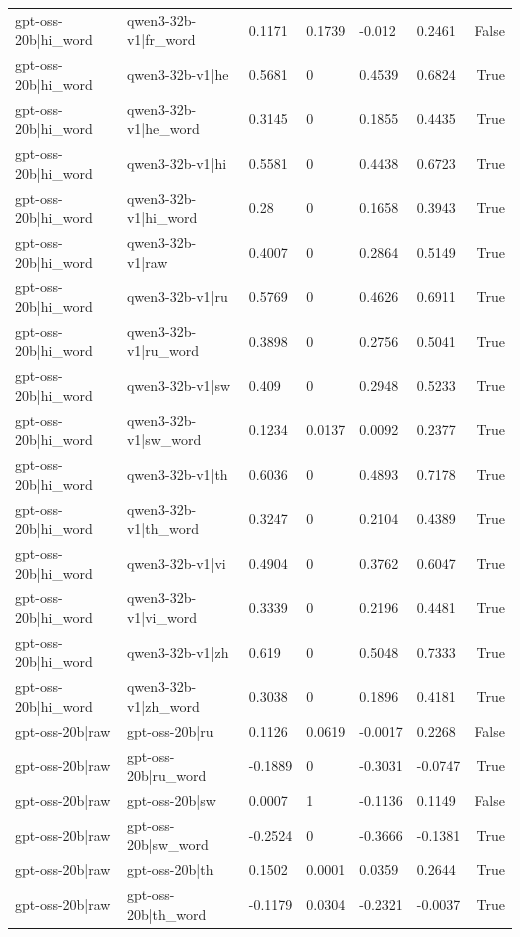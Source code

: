 \begin{table}
\begin{tabular}{llllllr}
gpt-oss-20b|hi_word & qwen3-32b-v1|fr_word & 0.1171 & 0.1739 & -0.012 & 0.2461 & False \\
gpt-oss-20b|hi_word & qwen3-32b-v1|he & 0.5681 & 0 & 0.4539 & 0.6824 & True \\
gpt-oss-20b|hi_word & qwen3-32b-v1|he_word & 0.3145 & 0 & 0.1855 & 0.4435 & True \\
gpt-oss-20b|hi_word & qwen3-32b-v1|hi & 0.5581 & 0 & 0.4438 & 0.6723 & True \\
gpt-oss-20b|hi_word & qwen3-32b-v1|hi_word & 0.28 & 0 & 0.1658 & 0.3943 & True \\
gpt-oss-20b|hi_word & qwen3-32b-v1|raw & 0.4007 & 0 & 0.2864 & 0.5149 & True \\
gpt-oss-20b|hi_word & qwen3-32b-v1|ru & 0.5769 & 0 & 0.4626 & 0.6911 & True \\
gpt-oss-20b|hi_word & qwen3-32b-v1|ru_word & 0.3898 & 0 & 0.2756 & 0.5041 & True \\
gpt-oss-20b|hi_word & qwen3-32b-v1|sw & 0.409 & 0 & 0.2948 & 0.5233 & True \\
gpt-oss-20b|hi_word & qwen3-32b-v1|sw_word & 0.1234 & 0.0137 & 0.0092 & 0.2377 & True \\
gpt-oss-20b|hi_word & qwen3-32b-v1|th & 0.6036 & 0 & 0.4893 & 0.7178 & True \\
gpt-oss-20b|hi_word & qwen3-32b-v1|th_word & 0.3247 & 0 & 0.2104 & 0.4389 & True \\
gpt-oss-20b|hi_word & qwen3-32b-v1|vi & 0.4904 & 0 & 0.3762 & 0.6047 & True \\
gpt-oss-20b|hi_word & qwen3-32b-v1|vi_word & 0.3339 & 0 & 0.2196 & 0.4481 & True \\
gpt-oss-20b|hi_word & qwen3-32b-v1|zh & 0.619 & 0 & 0.5048 & 0.7333 & True \\
gpt-oss-20b|hi_word & qwen3-32b-v1|zh_word & 0.3038 & 0 & 0.1896 & 0.4181 & True \\
gpt-oss-20b|raw & gpt-oss-20b|ru & 0.1126 & 0.0619 & -0.0017 & 0.2268 & False \\
gpt-oss-20b|raw & gpt-oss-20b|ru_word & -0.1889 & 0 & -0.3031 & -0.0747 & True \\
gpt-oss-20b|raw & gpt-oss-20b|sw & 0.0007 & 1 & -0.1136 & 0.1149 & False \\
gpt-oss-20b|raw & gpt-oss-20b|sw_word & -0.2524 & 0 & -0.3666 & -0.1381 & True \\
gpt-oss-20b|raw & gpt-oss-20b|th & 0.1502 & 0.0001 & 0.0359 & 0.2644 & True \\
gpt-oss-20b|raw & gpt-oss-20b|th_word & -0.1179 & 0.0304 & -0.2321 & -0.0037 & True \\

\end{tabular}
\end{table}
